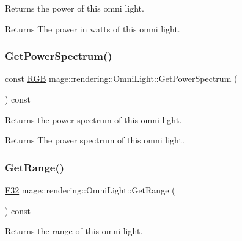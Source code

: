 Returns the power of this omni light.

\begin{DoxyReturn}{Returns}
The power in watts of this omni light. 
\end{DoxyReturn}
\hypertarget{classmage_1_1rendering_1_1_omni_light_a82366151b99cc4791d8b361331f75833}{}\label{classmage_1_1rendering_1_1_omni_light_a82366151b99cc4791d8b361331f75833} 
\subsubsection{\texorpdfstring{Get\+Power\+Spectrum()}{GetPowerSpectrum()}}
{\footnotesize\ttfamily const \hyperlink{structmage_1_1_r_g_b}{R\+GB} mage\+::rendering\+::\+Omni\+Light\+::\+Get\+Power\+Spectrum (\begin{DoxyParamCaption}{ }\end{DoxyParamCaption}) const\hspace{0.3cm}{\ttfamily [noexcept]}}

Returns the power spectrum of this omni light.

\begin{DoxyReturn}{Returns}
The power spectrum of this omni light. 
\end{DoxyReturn}
\hypertarget{classmage_1_1rendering_1_1_omni_light_af9bfc4b943b156756cd7c2323d93ebdd}{}\label{classmage_1_1rendering_1_1_omni_light_af9bfc4b943b156756cd7c2323d93ebdd} 
\subsubsection{\texorpdfstring{Get\+Range()}{GetRange()}}
{\footnotesize\ttfamily \hyperlink{namespacemage_aa97e833b45f06d60a0a9c4fc22ae02c0}{F32} mage\+::rendering\+::\+Omni\+Light\+::\+Get\+Range (\begin{DoxyParamCaption}{ }\end{DoxyParamCaption}) const\hspace{0.3cm}{\ttfamily [noexcept]}}

Returns the range of this omni light.

